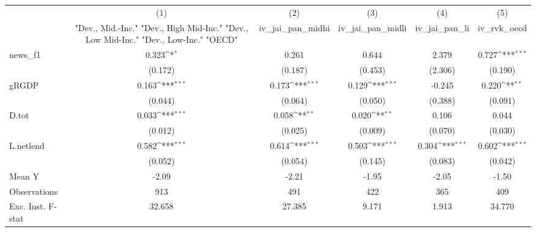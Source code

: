 {
\def\sym#1{\ifmmode^{#1}\else\(^{#1}\)\fi}
\begin{tabular}{l*{5}{c}}
\toprule
            &\multicolumn{1}{c}{(1)}&\multicolumn{1}{c}{(2)}&\multicolumn{1}{c}{(3)}&\multicolumn{1}{c}{(4)}&\multicolumn{1}{c}{(5)}\\
            &\multicolumn{1}{c}{ "Dev., Mid.-Inc." "Dev., High Mid-Inc." "Dev., Low Mid-Inc." "Dev., Low-Inc." "OECD" }&\multicolumn{1}{c}{iv\_jai\_pan\_midhi}&\multicolumn{1}{c}{iv\_jai\_pan\_midli}&\multicolumn{1}{c}{iv\_jai\_pan\_li}&\multicolumn{1}{c}{iv\_rvk\_oecd}\\
\midrule
news\_f1     &       0.323\sym{*}  &       0.261         &       0.644         &       2.379         &       0.727\sym{***}\\
            &     (0.172)         &     (0.187)         &     (0.453)         &     (2.306)         &     (0.190)         \\
\addlinespace
gRGDP       &       0.163\sym{***}&       0.173\sym{***}&       0.129\sym{***}&      -0.245         &       0.220\sym{**} \\
            &     (0.044)         &     (0.064)         &     (0.050)         &     (0.388)         &     (0.091)         \\
\addlinespace
D.tot       &       0.033\sym{***}&       0.058\sym{**} &       0.020\sym{**} &       0.106         &       0.044         \\
            &     (0.012)         &     (0.025)         &     (0.009)         &     (0.070)         &     (0.030)         \\
\addlinespace
L.netlend   &       0.582\sym{***}&       0.614\sym{***}&       0.503\sym{***}&       0.304\sym{***}&       0.602\sym{***}\\
            &     (0.052)         &     (0.054)         &     (0.145)         &     (0.083)         &     (0.042)         \\
\midrule
Mean Y      &       -2.09         &       -2.21         &       -1.95         &       -2.05         &       -1.50         \\
Observations&         913         &         491         &         422         &         365         &         409         \\
Exc. Inst. F-stat&      32.658         &      27.385         &       9.171         &       1.913         &      34.770         \\
\bottomrule
\end{tabular}
}
